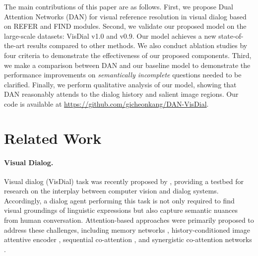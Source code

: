 \documentclass[11pt,a4paper]{article}
\begin{document}
The main contributions of this paper are as follows. First, we propose Dual Attention Networks (DAN) for visual reference resolution in visual dialog based on REFER and FIND modules. Second, we validate our proposed model on the large-scale datasets: VisDial v1.0 and v0.9. Our model achieves a new state-of-the-art results compared to other methods. We also conduct ablation studies by four criteria to demonstrate the effectiveness of our proposed components. Third, we make a comparison between DAN and our baseline model to demonstrate the performance improvements on {\it semantically incomplete} questions needed to be clarified. Finally, we perform qualitative analysis of our model, showing that DAN reasonably attends to the dialog history and salient image regions. Our code is available at \url{https://github.com/gicheonkang/DAN-VisDial}. 

\section{Related Work}

\paragraph{Visual Dialog.} Visual dialog (VisDial) task was recently proposed by \cite{das2017visual}, providing a testbed for research on the interplay between computer vision and dialog systems. Accordingly, a dialog agent performing this task is not only required to find visual groundings of linguistic expressions but also capture semantic nuances from human conversation. Attention-based approaches were primarily proposed to address these challenges, including memory networks \cite{das2017visual}, history-conditioned image attentive encoder \cite{lu2017best}, sequential co-attention \cite{wu2018you},  and synergistic co-attention networks \cite{guo2019image}.
\end{document}

